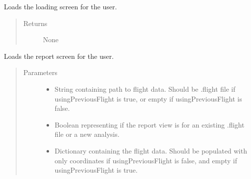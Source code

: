 \documentclass[letterpaper,10pt,english]{sphinxmanual}
\begin{document}
\begin{fulllineitems}
\begin{fulllineitems}
\label{\detokenize{index:src.Controllers.Program_Controller.Controller.show_loading_window}}
Loads the loading screen for the user.
\begin{quote}\begin{description}
\item[{Returns}] \leavevmode
None

\end{description}\end{quote}

\end{fulllineitems}


\begin{fulllineitems}
\label{\detokenize{index:src.Controllers.Program_Controller.Controller.show_report_window}}
Loads the report screen for the user.
\begin{quote}\begin{description}
\item[{Parameters}] \leavevmode\begin{itemize}
\item {} 
 \textendash{} String containing path to flight data. Should be .flight file if usingPreviousFlight is true, or empty if usingPreviousFlight is false.

\item {} 
 \textendash{} Boolean representing if the report view is for an existing .flight file or a new analysis.

\item {} 
 \textendash{} Dictionary containing the flight data. Should be populated with only coordinates if usingPreviousFlight is false, and empty if usingPreviousFlight is true.

\end{itemize}


\end{description}
\end{quote}
\end{fulllineitems}
\end{fulllineitems}
\end{document}
